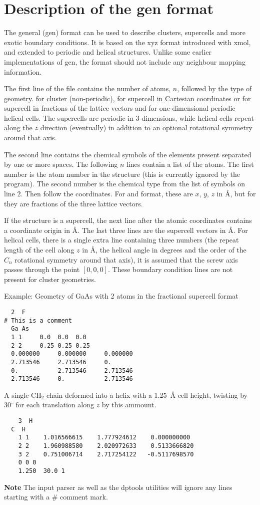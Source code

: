 
\chapter{Description of the gen format}
\label{app:gen}

The general (gen) format can be used to describe clusters, supercells and more
exotic boundary conditions. It is based on the xyz format introduced with xmol,
and extended to periodic and helical structures. Unlike some earlier
implementations of gen, the format should not include any neighbour mapping
information.

The first line of the file contains the number of atoms, $n$, followed by the
type of geometry.  for cluster (non-periodic),  for supercell in
Cartesian coordinates or  for supercell in fractions of the lattice
vectors and  for one-dimensional periodic helical cells. The supercells
are periodic in 3 dimensions, while helical cells repeat along the $z$ direction
(eventually) in addition to an optional rotational symmetry around that axis.

The second line contains the chemical symbols of the elements present
separated by one or more spaces.  The following $n$ lines contain a
list of the atoms. The first number is the atom number in the
structure (this is currently ignored by the program). The second
number is the chemical type from the list of symbols on line 2. Then
follow the coordinates. For  and  format, these are $x$,
$y$, $z$ in {\AA}, but for  they are fractions of the three
lattice vectors.

If the structure is a supercell, the next line after the atomic coordinates
contains a coordinate origin in {\AA}. The last three lines are the supercell
vectors in {\AA}. For helical cells, there is a single extra line containing
three numbers (the repeat length of the cell along $z$ in {\AA}, the helical
angle in degrees and the order of the $C_n$ rotational symmetry around that
axis), it is assumed that the screw axis passes through the point
$[0,0,0]$. These boundary condition lines are not present for cluster
geometries.

Example: Geometry of GaAs with 2 atoms in the fractional supercell
format
\begin{verbatim}
  2  F
# This is a comment
  Ga As
  1 1     0.0  0.0  0.0
  2 2     0.25 0.25 0.25
  0.000000     0.000000     0.000000
  2.713546     2.713546     0.      
  0.           2.713546     2.713546
  2.713546     0.           2.713546
\end{verbatim}

A single CH$_2$ chain deformed into a helix with a 1.25~{\AA} cell
height, twisting by 30$^\circ$ for each translation along $z$ by this
ammount.
\begin{verbatim}
    3  H
  C  H
    1 1    1.016566615    1.777924612    0.000000000
    2 2    1.960988580    2.020972633    0.5133666820
    3 2    0.751006714    2.717254122   -0.5117698570
    0 0 0
    1.250  30.0 1
\end{verbatim}

{\bf Note} The \dftbp{} input parser as well as the dptools utilities will
ignore any lines starting with a \# comment mark.
